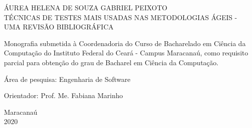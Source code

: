 \begin{titlepage}
\vfill
\begin{center}

    {\large ÁUREA HELENA DE SOUZA GABRIEL PEIXOTO\\}
    \vspace{2cm}
    {\Large \textsc{T{\'E}CNICAS DE TESTES MAIS USADAS NAS METODOLOGIAS {\'A}GEIS - UMA REVIS{\~A}O BIBLIOGR{\'A}FICA}\\}
    \vspace{1cm}
    \hspace{.45\linewidth}
    \begin{minipage}{.50\linewidth}

            Monografia submetida à Coordenadoria do Curso de Bacharelado em Ciência da Computação do Instituto Federal do Ceará - Campus Maracanaú, como requisito 
            parcial para obtenção do grau de Bacharel em Ciência da Computação.

            \vspace{0.5 cm}

            Área de pesquisa: Engenharia de Software

            \vspace{0.5 cm}

            Orientador: Prof. Me. Fabiana Marinho
    
    \end{minipage}

    \vspace{2cm}
    \vfill
    {\large Maracanaú\\ 2020}
\end{center}

\end{titlepage}
